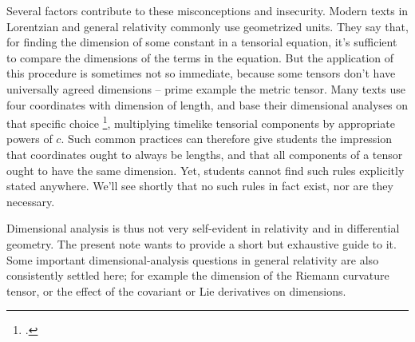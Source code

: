\documentclass[\ifafour a4paper,12pt,\else a5paper,10pt,\fi%
onecolumn,oneside,article,%
british%
]{memoir}
\theoremstyle{remark}
\theoremstyle{innote}
\newcommand*{\citep}{\footcites}
\renewcommand*{\|}[1][]{\nonscript\,#1\vert\nonscript\;\mathopen{}}
\newcommand*{\sect}{\S}%
\newcommand*{\eqn}{eq.}%
\newcommand*{\eg}{{e.g.}}
\begin{document}
Several factors contribute to these misconceptions and insecurity. Modern
texts in Lorentzian and general relativity commonly use geometrized units.
They say that, for finding the dimension of some constant in a tensorial
equation, it's sufficient to compare the dimensions of the terms in the
equation. But the application of this procedure is sometimes not so
immediate, because some tensors don't have universally agreed dimensions --
prime example the metric tensor. Many texts use four coordinates with
dimension of length, and base their dimensional analyses on that specific
choice \citep[\eg][p.~71 \eqn~(37.1)]{tolman1934_t1949}[p.~80
\eqn~(32.15)]{landauetal1939_t1996}[for exceptions with coordinates with
mixed dimensions see
\eg][\sect~V.55]{fock1955_t1964}[\sect~4.1]{mcvittie1956_r1965}[\sect~VII.1]{fokker1960_t1965}[\sect~F.III.280]{truesdelletal1960}[\sect~X]{kitano2013},
multiplying timelike tensorial components by appropriate powers of $c$.
Such common practices can therefore give students the impression that
coordinates ought to always be lengths, and that all components of a tensor
ought to have the same dimension. Yet, students cannot find such rules
explicitly stated anywhere. We'll see shortly that no such rules in fact
exist, nor are they necessary.

\medskip

Dimensional analysis is thus not very self-evident in relativity and in
differential geometry. The present note wants to provide a short but
exhaustive guide to it.
Some important dimensional-analysis questions in general relativity are
also consistently settled here; for example the dimension of the Riemann
curvature tensor, or the effect of the covariant or Lie derivatives on
dimensions.
\end{document}
